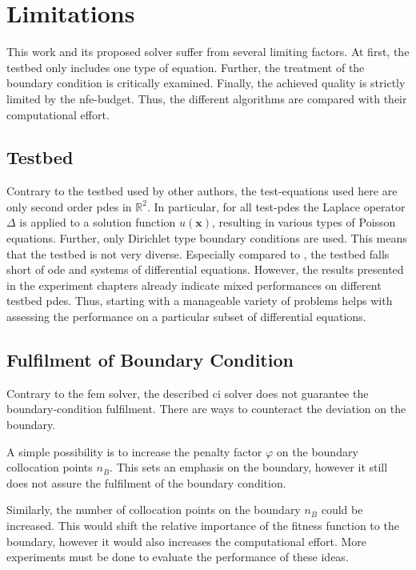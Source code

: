 \documentclass[./\jobname.tex]{subfiles}
\begin{document}
\chapter{Limitations}
This work and its proposed solver suffer from several limiting factors. At first, the testbed only includes one type of equation. Further, the treatment of the boundary condition is critically examined. Finally, the achieved quality is strictly limited by the \gls{nfe}-budget. Thus, the different algorithms are compared with their computational effort. 

\section{Testbed}

Contrary to the testbed used by other authors, the test-equations used here are only second order \gls{pde}s in $\mathbb{R}^2$. In particular, for all test-\gls{pde}s the Laplace operator $\Delta$ is applied to a solution function $u(\mathbf{x})$, resulting in various types of Poisson equations. Further, only Dirichlet type boundary conditions are used. This means that the testbed is not very diverse. Especially compared to \cite{chaquet_using_2019}, the testbed falls short of \gls{ode} and systems of differential equations. However, the results presented in the experiment chapters already indicate mixed performances on different testbed \gls{pde}s. Thus, starting with a manageable variety of problems helps with assessing the performance on a particular subset of differential equations.  


\section{Fulfilment of Boundary Condition}
Contrary to the \gls{fem} solver, the described \gls{ci} solver does not guarantee the boundary-condition fulfilment. There are ways to counteract the deviation on the boundary. 

A simple possibility is to increase the penalty factor $\varphi$ on the boundary collocation points $n_B$. This sets an emphasis on the boundary, however it still does not assure the fulfilment of the boundary condition. 

Similarly, the number of collocation points on the boundary $n_B$ could be increased. This would shift the relative importance of the fitness function to the boundary, however it would also increases the computational effort. More experiments must be done to evaluate the performance of these ideas. 
\end{document}
